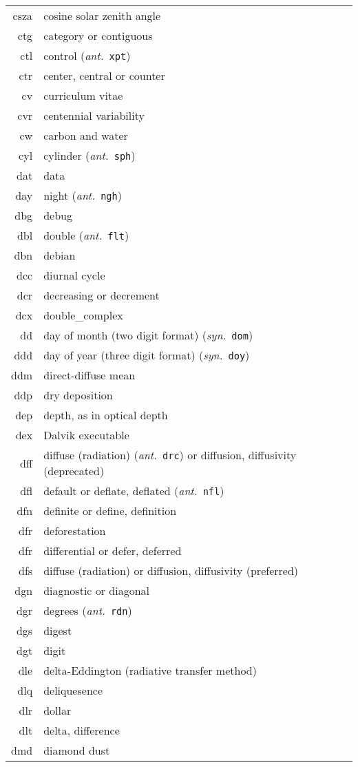 \documentclass[12pt,twoside]{article}
\newcommand{\ant}[1]{(\textit{ant.}~\texttt{#1})}
\newcommand{\syn}[1]{(\textit{syn.}~\texttt{#1})}
\begin{document}
\begin{longtable}[>{\bfseries}l]{>{\ttfamily}r l}
csza & cosine solar zenith angle \\
ctg & category or contiguous \\
ctl & control \ant{xpt} \\
ctr & center, central or counter \\
cv & curriculum vitae \\
cvr & centennial variability \\
cw & carbon and water \\
cyl & cylinder \ant{sph} \\
dat & data \\
day & night \ant{ngh} \\
dbg & debug \\
dbl & double \ant{flt} \\
dbn & debian \\
dcc & diurnal cycle \\
dcr & decreasing or decrement \\
dcx & double\_complex \\
dd & day of month (two digit format) \syn{dom} \\
ddd & day of year (three digit format) \syn{doy} \\
ddm & direct-diffuse mean \\
ddp & dry deposition \\
dep & depth, as in optical depth \\
dex & Dalvik executable \\
dff & diffuse (radiation) \ant{drc} or diffusion, diffusivity (deprecated) \\
dfl & default or deflate, deflated \ant{nfl} \\
dfn & definite or define, definition \\
dfr & deforestation \\
dfr & differential or defer, deferred \\
dfs & diffuse (radiation) or diffusion, diffusivity (preferred) \\
dgn & diagnostic or diagonal \\
dgr & degrees \ant{rdn} \\
dgs & digest \\
dgt & digit \\
dle & delta-Eddington (radiative transfer method) \\
dlq & deliquesence \\
dlr & dollar \\
dlt & delta, difference \\
dmd & diamond dust \\

\end{longtable}
\end{document}
